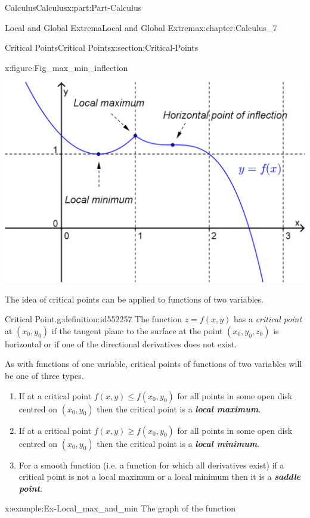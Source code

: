 \documentclass[oneside,10pt,]{book}
\newcommand{\alert}[1]{\textbf{\textit{#1}}}
\numberwithin{equation}{section}
\begin{document}
\begin{partptx}{Calculus}{}{Calculus}{}{}{x:part:Part-Calculus}
\begin{chapterptx}{Local and Global Extrema}{}{Local and Global Extrema}{}{}{x:chapter:Calculus_7}
\begin{sectionptx}{Critical Points}{}{Critical Points}{}{}{x:section:Critical-Points}
\begin{figureptx}{}{x:figure:Fig_max_min_inflection}{}
\begin{image}{0.15}{0.7}{0.15}%
\includegraphics[width=\linewidth]{./Calculus/Images/7/Fig1_max_min_inflection.png}
\end{image}%
\tcblower
\end{figureptx}%
The idea of critical points can be applied to functions of two variables.%
\begin{definition}{Critical Point.}{g:definition:id552257}%
The function \(z=f(x,y)\) has a \emph{critical point} at \((x_0,y_0)\) if the tangent plane to the surface at the point \((x_0,y_0,z_0)\) is horizontal or if one of the directional derivatives does not exist.%
\end{definition}
As with functions of one variable, critical points of functions of two variables will be one of three types.%
\par
%
\begin{enumerate}[label=\arabic*]
\item{}If at a critical point \(f(x,y) \leq f(x_0,y_0)\) for all points in some open disk centred on \((x_0,y_0)\) then the critical point is a \alert{local maximum}.%
\item{}If at a critical point \(f(x,y) \geq f(x_0,y_0)\) for all points in some open disk centred on \((x_0,y_0)\) then the critical point is a \alert{local minimum}.%
\item{}For a smooth function (i.e. a function for which all derivatives exist) if a critical point is not a local maximum or a local minimum then it is a \alert{saddle point}.%
\end{enumerate}
%
\begin{example}{}{x:example:Ex-Local_max_and_min}%
The graph of the function%
\begin{equation*}

\end{equation*}
\end{example}
\end{sectionptx}
\end{chapterptx}
\end{partptx}
\end{document}
